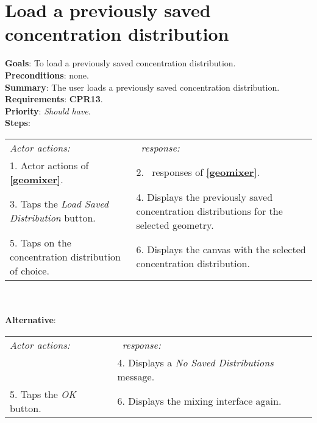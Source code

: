   \section{Load a previously saved concentration distribution}
  \label{loadsavedist}
  \textbf{Goals}: To load a previously saved concentration distribution.\\
  \textbf{Preconditions}: none.\\
  \textbf{Summary}: The user loads a previously saved concentration distribution.\\
  \textbf{Requirements}: \textbf{CPR13}.\\
  \textbf{Priority}: \emph{Should have}.\\
  \textbf{Steps}: \\
  \begin{tabular}{ p{} p{} }
  	\emph{Actor actions:} & \emph{\projectname\ response:} \\
  	1. Actor actions of \textbf{\ref{geomixer}}. & 2. \projectname\ responses of \textbf{\ref{geomixer}}. \\
	3. Taps the \emph{Load Saved Distribution} button. & 4. Displays the previously saved concentration distributions for the selected geometry. \\
	5. Taps on the concentration distribution of choice. & 6. Displays the canvas with the selected concentration distribution. \\
	\end{tabular}
	        \\
     \\\textbf{Alternative}: \\
    \begin{tabular}{ p{} p{} }
  	\emph{Actor actions:} & \emph{\projectname\ response:} \\
            & 4. Displays a \emph{No Saved Distributions} message. \\
    5. Taps the \emph{OK} button. & 6. Displays the mixing interface again. \\
  \end{tabular}

